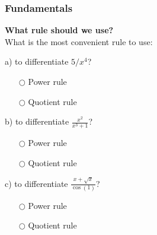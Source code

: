 \documentclass[pdftex, brazil, 12pt, twoside]{article}
\begin{document}
\begin{figure}[H]
  \begin{center}
  \end{center}
\end{figure}

\subsubsection{Fundamentals}
\label{u2-quotient-rule-fundamentals}

\begin{exercise}
  \textbf{What rule should we use?}\\%
  What is the most convenient rule to use:

  a) to differentiate $5/x^4$?
  \begin{itemize}[noitemsep]
  \item[$\bigcirc$] Power rule
  \item[$\bigcirc$] Quotient rule
  \end{itemize}

  b) to differentiate $\frac{x^2}{x^3 + 1}$?
  \begin{itemize}[noitemsep]
  \item[$\bigcirc$] Power rule
  \item[$\bigcirc$] Quotient rule
  \end{itemize}

  c) to differentiate $\frac{x + \sqrt{x}}{\cos{(1)}}$?
  \begin{itemize}[noitemsep]
  \item[$\bigcirc$] Power rule
  \item[$\bigcirc$] Quotient rule
  \end{itemize}
\end{exercise}
\end{document}
